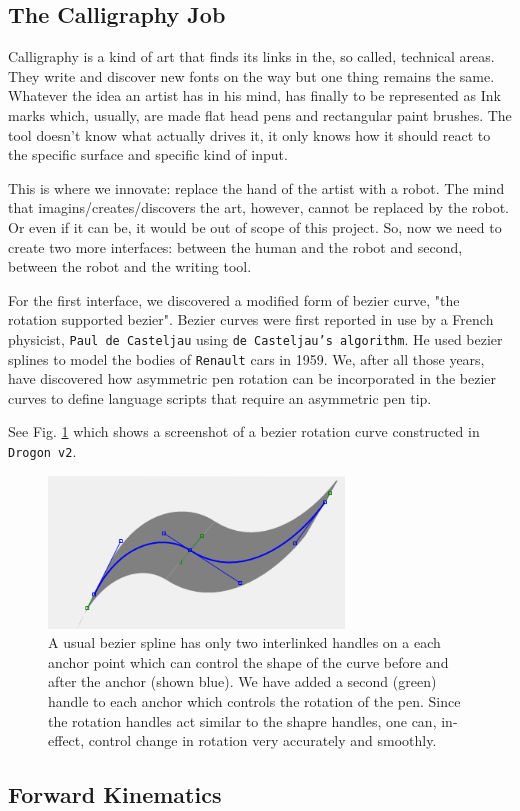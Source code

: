 \subsection{The Calligraphy Job}
{
        Calligraphy is a kind of art that finds its links in the, so called, technical areas. They write and discover new fonts on the way but one thing remains the same. Whatever the idea an artist has in his mind, has finally to be represented as Ink marks which, usually, are made flat head pens and rectangular paint brushes. The tool doesn't know what actually drives it, it only knows how it should react to the specific surface and specific kind of input.

        This is where we innovate: replace the hand of the artist with a robot. The mind that imagins/creates/discovers the art, however, cannot be replaced by the robot. Or even if it can be, it would be out of scope of this project. So, now we need to create two more interfaces: between the human and the robot and second, between the robot and the writing tool.

        For the first interface, we discovered a modified form of bezier curve, "the rotation supported bezier". Bezier curves were first reported in use by a French physicist, \texttt{Paul de Casteljau} using \texttt{de Casteljau's algorithm}. He used bezier splines to model the bodies of \texttt{Renault} cars in 1959. We, after all those years, have discovered how asymmetric pen rotation can be incorporated in the bezier curves to define language scripts that require an asymmetric pen tip.

        See Fig. \ref{FigBezier} which shows a screenshot of a bezier rotation curve constructed in \texttt{Drogon v2}.

        \begin{figure}
          \centering
          \includegraphics[width=0.7\textwidth]{bezier.png}
          \caption{A usual bezier spline has only two interlinked handles on a each anchor point which can control the shape of the curve before and after the anchor (shown blue). We have added a second (green) handle to each anchor which controls the rotation of the pen. Since the rotation handles act similar to the shapre handles, one can, in-effect, control change in rotation very accurately and smoothly.
          } \label{FigBezier}
        \end{figure}

    }
\subsection{Forward Kinematics}

\clearpage